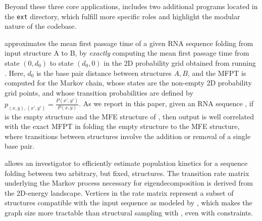 Beyond these three core applications, \hermes includes two
additional programs located in the {\tt ext} directory, which fulfill
more specific roles and highlight the modular nature of the codebase.

\fftmfpt approximates the mean first passage time of a given RNA
sequence folding from input structure A to B, by {\em exactly}
computing the mean first passage time from state $(0,d_0)$ to state
$(d_0,0)$ in the 2D probability grid obtained from running
\ffttwo. Here, $d_0$ is the base pair distance between structures
$A,B$, and the MFPT is computed for the Markov chain, whose states are
the non-empty 2D probability grid points, and whose transition
probabilities are defined by $p_{(x,y),(x',y')} =
\frac{P(x',y')}{P(x,y)}$. As we report in this paper, given an RNA
sequence \seq, if \strA is the empty structure and \strB the MFE
structure of \seq, then \fftmfpt output is well correlated with the
exact MFPT in folding the empty structure to the MFE structure, where
transitions between structures involve the addition or removal of a
single base pair.

\ffteq allows an investigator to efficiently estimate population
kinetics for a sequence folding between two arbitrary, but fixed,
structures. The transition rate matrix underlying the Markov process
necessary for eigendecomposition is derived from the 2D-energy
landscape. Vertices in the rate matrix represent a subset of
structures compatible with the input sequence as modeled by
\ffttwo, which makes the graph size more tractable than structural
sampling with \rnasub, even with constraints.


